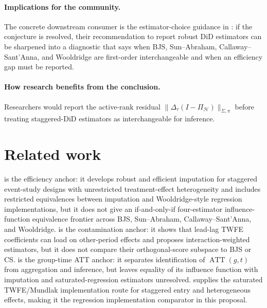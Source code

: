 \documentclass[11pt]{article}
\newcommand{\calH}{\mathcal{H}}
\theoremstyle{definition}
\theoremstyle{plain}
\theoremstyle{remark}
\begin{document}
\paragraph{Implications for the community.}
The concrete downstream consumer is the estimator-choice guidance in
\citet{RothSantAnnaBilinskiPoe2023}: if the conjecture is resolved, their
recommendation to report robust DiD estimators can be sharpened into a diagnostic
that says when BJS, Sun--Abraham, Callaway--Sant'Anna, and Wooldridge are
first-order interchangeable and when an efficiency gap must be reported.

\paragraph{How research benefits from the conclusion.}
Researchers would report the active-rank residual
\(\|\Delta_\tau(I-\Pi_{\calH})\|_{\Sigma,\pi}\) before treating staggered-DiD
estimators as interchangeable for inference.

\section{Related work}
\citet{BorusyakJaravelSpiess2024} is the efficiency anchor: it develops robust
and efficient imputation for staggered event-study designs with unrestricted
treatment-effect heterogeneity and includes restricted equivalences between
imputation and Wooldridge-style regression implementations, but it does not give
an if-and-only-if four-estimator influence-function equivalence frontier across
BJS, Sun--Abraham, Callaway--Sant'Anna, and Wooldridge.  \citet{SunAbraham2021} is the
contamination anchor: it shows that lead-lag TWFE coefficients can load on
other-period effects and proposes interaction-weighted estimators, but it does
not compare their orthogonal-score subspace to BJS or CS.  \citet{CallawaySantAnna2021}
is the group-time ATT anchor: it separates identification of \(\operatorname{ATT}(g,t)\)
from aggregation and inference, but leaves equality of its influence function
with imputation and saturated-regression estimators unresolved.
\citet{Wooldridge2021} supplies the saturated TWFE/Mundlak implementation route
for staggered entry and heterogeneous effects, making it the regression
implementation comparator in this proposal.
\end{document}
